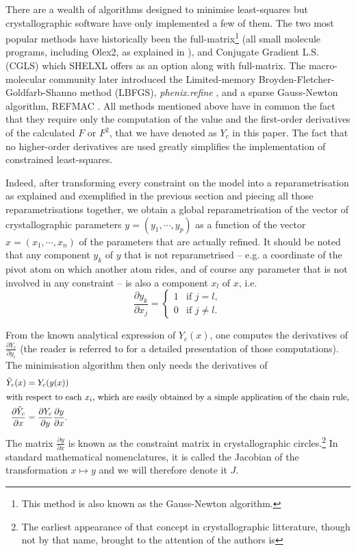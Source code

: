 \documentclass[pdf]{iucr}
\newcommand{\partialder}[2]{\frac{\partial #1}{\partial #2}}
\begin{document}
There are a wealth of algorithms designed to minimise least-squares but crystallographic software have only implemented a few of them. The two most popular methods have historically been the full-matrix\footnote{This method is also known as the Gauss-Newton algorithm.} (all small molecule programs, including Olex2, as explained in ), and Conjugate Gradient L.S. (CGLS) which SHELXL offers as an option along with full-matrix.  The macro-molecular community later introduced the Limited-memory Broyden-Fletcher-Goldfarb-Shanno method (LBFGS), \emph{phenix.refine} , and a sparse Gauss-Newton algorithm, REFMAC . All methods mentioned above have in common the fact that they require only the computation of the value and the first-order derivatives of the calculated $F$ or $F^2$, that we have denoted as $Y_c$ in this paper. The fact that no higher-order derivatives are used greatly simplifies the implementation of constrained least-squares.

Indeed, after transforming every constraint on the model into a reparametrisation as explained and exemplified in the previous section and piecing all those reparametrisations together, we obtain a global reparametrisation of the vector of crystallographic parameters $y = (y_1, \cdots, y_p)$ as a function of the vector $x=(x_1, \cdots, x_n)$ of the parameters that are actually refined. It should be noted that any component $y_k$ of $y$ that is not reparametrised -- e.g. a coordinate of the pivot atom on which another atom rides, and of course any parameter that is not involved in any constraint --  is also a component $x_l$ of $x$, i.e. 
\begin{equation}
\partialder{y_k}{x_j} = \begin{cases} 
   1& \text{if $j=l$},\\
   0& \text{if $j \neq l$}.
   \end{cases}
\nonumber
\end{equation}

 From the known analytical expression of $Y_c(x)$, one computes the derivatives of $\partialder{Y_c}{y_i}$ (the reader is referred to  for a detailed presentation of those computations). The minimisation algorithm then only needs the derivatives of
\begin{align}
\tilde{Y}_c(x) &= Y_c(y(x)) \\
 \shortintertext{with respect to each $x_i$, which are easily obtained by a simple application of the chain rule,}
\partialder{\tilde{Y}_c}{x} &= \partialder{Y_c}{y} \partialder{y}{x}.
\label{eqn:chainrule}
\end{align}
The matrix $\partialder{y}{x}$ is known as the constraint matrix in crystallographic circles.\footnote{The earliest appearance of that concept in crystallographic litterature, though not by that name, brought to the attention of the authors is } In standard mathematical nomenclatures, it is called the Jacobian of the transformation $x \mapsto y$ and we will therefore denote it $J$.
\end{document}
